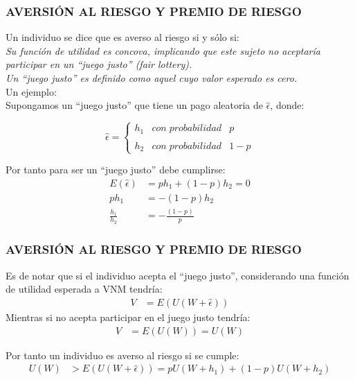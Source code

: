 \begin{frame}
\frametitle{AVERSIÓN AL RIESGO Y PREMIO DE RIESGO}

Un individuo se dice que es averso al riesgo si y sólo si:
\\

\textit{Su función de utilidad es concova, implicando que este sujeto no aceptaría participar en un ``juego justo'' (fair lottery).\\
     Un ``juego justo'' es definido como aquel cuyo valor esperado es cero.}\\

Un ejemplo:\\
Supongamos un ``juego justo'' que tiene un pago aleatoria de $ \hat{\epsilon}$, donde:

\[
\hat{\epsilon}= \left\{ \begin{array}{lcl}
h_{1} & con\; probabilidad & p \\
& & \\
h_{2} & con\; probabilidad & 1-p
\end{array}
\right.
\] 

Por tanto para ser un ``juego justo'' debe cumplirse:
\begin{align}
E(\hat{\epsilon})&=ph_{1}+(1-p)h_{2}=0 \nonumber \\
ph_{1}&=-(1-p)h_{2} \nonumber \\
\frac{h_{1}}{h_{2}}&=-\frac{(1-p)}{p}\nonumber
\end{align}    
\end{frame}


\begin{frame}
    \frametitle{AVERSIÓN AL RIESGO Y PREMIO DE RIESGO}
  Es de notar que si el individuo acepta el ``juego justo'', considerando una función de utilidad esperada a VNM tendría:
\begin{align}
V&=E(U(W+\hat{\epsilon}))\nonumber 
\end{align}    
 Mientras si no acepta participar en el juego justo tendría:
 \begin{align}
 V&=E(U(W))=U(W)\nonumber 
 \end{align}     

Por tanto un individuo es averso al riesgo si se cumple:
\begin{align}
U(W)&> E(U(W+\hat{\epsilon}))=pU(W+h_{1})+(1-p)U(W+h_{2})\nonumber 
\end{align}  
  
\end{frame}


